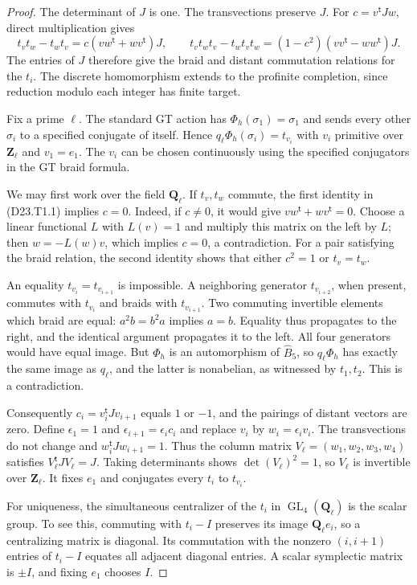 \begin{proof}
The determinant of $J$ is one. The transvections preserve $J$.
For $c=v^{\mathsf t}Jw$, direct multiplication gives
\[
t_vt_w-t_wt_v=c(vw^{\mathsf t}+wv^{\mathsf t})J,
\qquad
t_vt_wt_v-t_wt_vt_w=(1-c^2)(vv^{\mathsf t}-ww^{\mathsf t})J.
\tag{D23.T1.1}
\]
The entries of $J$ therefore give the braid and distant commutation
relations for the $t_i$. The discrete homomorphism extends to the
profinite completion, since reduction modulo each integer has finite
target.

Fix a prime $\ell$. The standard GT action has
$\Phi_h(\sigma_1)=\sigma_1$ and sends every other $\sigma_i$ to a
specified conjugate of itself. Hence
$q_\ell\Phi_h(\sigma_i)=t_{v_i}$ with $v_i$ primitive over
$\mathbf Z_\ell$ and $v_1=e_1$. The $v_i$ can be chosen continuously
using the specified conjugators in the GT braid formula.

We may first work over the field $\mathbf Q_\ell$. If $t_v,t_w$
commute, the first identity in (D23.T1.1) implies $c=0$.
Indeed, if $c\ne0$, it would give $vw^{\mathsf t}+wv^{\mathsf t}=0$.
Choose a linear functional $L$ with $L(v)=1$ and multiply this matrix
on the left by $L$; then $w=-L(w)v$, which implies $c=0$, a
contradiction. For a pair satisfying the braid relation, the second
identity shows that either $c^2=1$ or $t_v=t_w$.

An equality $t_{v_i}=t_{v_{i+1}}$ is impossible. A neighboring
generator $t_{v_{i+2}}$, when present, commutes with $t_{v_i}$ and
braids with $t_{v_{i+1}}$. Two commuting invertible elements which
braid are equal: $a^2b=b^2a$ implies $a=b$. Equality thus propagates
to the right, and the identical argument propagates it to the left.
All four generators would have equal image. But $\Phi_h$ is an
automorphism of $\widehat B_5$, so $q_\ell\Phi_h$ has exactly the
same image as $q_\ell$, and the latter is nonabelian, as witnessed by
$t_1,t_2$. This is a contradiction.

Consequently $c_i=v_i^{\mathsf t}Jv_{i+1}$ equals $1$ or $-1$,
and the pairings of distant vectors are zero. Define
$\epsilon_1=1$ and $\epsilon_{i+1}=\epsilon_i c_i$ and replace
$v_i$ by $w_i=\epsilon_i v_i$. The transvections do not change and
$w_i^{\mathsf t}Jw_{i+1}=1$. Thus the column matrix
$V_\ell=(w_1,w_2,w_3,w_4)$ satisfies
$V_\ell^{\mathsf t}JV_\ell=J$. Taking determinants shows
$\det(V_\ell)^2=1$, so $V_\ell$ is invertible over
$\mathbf Z_\ell$. It fixes $e_1$ and conjugates every $t_i$ to
$t_{v_i}$.

For uniqueness, the simultaneous centralizer of the $t_i$ in
$\operatorname{GL}_4(\mathbf Q_\ell)$ is the scalar group. To see
this, commuting with $t_i-I$ preserves its image $\mathbf Q_\ell e_i$,
so a centralizing matrix is diagonal. Its commutation with the
nonzero $(i,i+1)$ entries of $t_i-I$ equates all adjacent diagonal
entries. A scalar symplectic matrix is $\pm I$, and fixing $e_1$
chooses $I$.


\end{proof}
